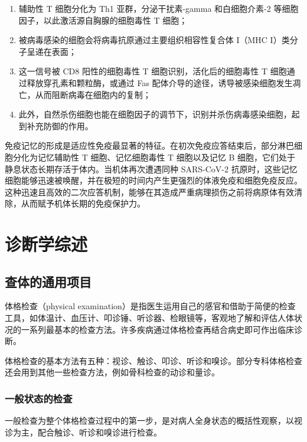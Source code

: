 \documentclass[9pt,a4paper,twoside]{rho-class/rho}
\begin{document}
    \begin{enumerate}
        \item 辅助性 T 细胞分化为 Th1 亚群，分泌干扰素-gamma 和白细胞介素-2 等细胞因子，以此激活源自胸腺的细胞毒性 T 细胞；
        \item 被病毒感染的细胞会将病毒抗原通过主要组织相容性复合体 I（MHC I）类分子呈递在表面；
        \item 这一信号被 CD8 阳性的细胞毒性 T 细胞识别，活化后的细胞毒性 T 细胞通过释放穿孔素和颗粒酶，或通过 Fas 配体介导的途径，诱导被感染细胞发生凋亡，从而阻断病毒在细胞内的复制；
        \item 此外，自然杀伤细胞也能在细胞因子的调节下，识别并杀伤病毒感染细胞，起到补充防御的作用。
    \end{enumerate}
    
    免疫记忆的形成是适应性免疫最显著的特征。在初次免疫应答结束后，部分淋巴细胞分化为记忆辅助性 T 细胞、记忆细胞毒性 T 细胞以及记忆 B 细胞，它们处于静息状态长期存活于体内。当机体再次遭遇同种 SARS-CoV-2 抗原时，这些记忆细胞能够迅速被唤醒，并在极短的时间内产生更强烈的体液免疫和细胞免疫反应。这种迅速且高效的二次应答机制，能够在其造成严重病理损伤之前将病原体有效清除，从而赋予机体长期的免疫保护力。

\section{诊断学综述}

    \subsection{查体的通用项目}

    体格检查（physical examination）是指医生运用自己的感官和借助于简便的检查工具，如体温计、血压计、叩诊锤、听诊器、检眼镜等，客观地了解和评估人体状况的一系列最基本的检查方法。许多疾病通过体格检查再结合病史即可作出临床诊断。

    体格检查的基本方法有五种：视诊、触诊、叩诊、听诊和嗅诊。部分专科体格检查还会用到其他一些检查方法，例如骨科检查的动诊和量诊。

    \subsubsection{一般状态的检查}

    一般检查为整个体格检查过程中的第一步，是对病人全身状态的概括性观察，以视诊为主，配合触诊、听诊和嗅诊进行检查。
    
\end{document}
